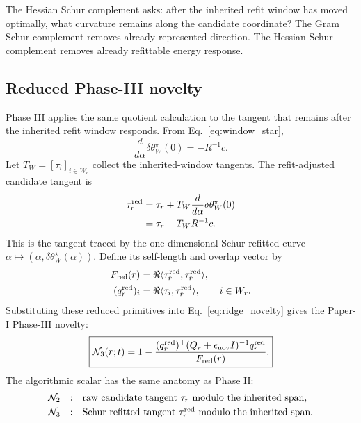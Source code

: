 \documentclass[10pt,twocolumn]{article}
\begin{document}
\begin{jargonbox}
The Hessian Schur complement asks: after the inherited refit window has moved optimally, what curvature remains along the candidate coordinate? The Gram Schur complement removes already represented direction. The Hessian Schur complement removes already refittable energy response.
\end{jargonbox}

\subsection{Reduced Phase-III novelty}

Phase III applies the same quotient calculation to the tangent that remains after the inherited refit window responds. From Eq.~\eqref{eq:window_star},
\begin{equation}
\frac{d}{d\alpha}\delta\theta_W^\star(0)=-R^{-1}c.
\label{eq:window_response_derivative}
\end{equation}
Let \(T_W=[\tau_i]_{i\in W_r}\) collect the inherited-window tangents. The refit-adjusted candidate tangent is
\begin{equation}
\begin{aligned}
\tau_r^{\rm red}
&=\tau_r+
T_W\frac{d}{d\alpha}\delta\theta_W^\star(0)\\
&=\tau_r-T_WR^{-1}c.
\end{aligned}
\label{eq:reduced_tangent}
\end{equation}
This is the tangent traced by the one-dimensional Schur-refitted curve
\(\alpha\mapsto(\alpha,\delta\theta_W^\star(\alpha))\). Define its self-length and overlap vector by
\begin{align}
F_{\rm red}(r)&=\Re\langle\tau_r^{\rm red},\tau_r^{\rm red}\rangle,
\notag\\
(q_r^{\rm red})_i&=\Re\langle\tau_i,\tau_r^{\rm red}\rangle,
\qquad i\in W_r.
\label{eq:reduced_F_q}
\end{align}
Substituting these reduced primitives into Eq.~\eqref{eq:ridge_novelty} gives the Paper-I Phase-III novelty:
\begin{equation}
\boxed{
\mathcal N_3(r;t)
=
1-
\frac{
(q_r^{\rm red})^\top
(Q_r+\epsilon_{\rm nov}I)^{-1}
q_r^{\rm red}
}{
F_{\rm red}(r)
}.
}
\label{eq:phase3_reduced_novelty}
\end{equation}
The algorithmic scalar has the same anatomy as Phase II:
\begin{equation}
\begin{array}{ccl}
\mathcal N_2&:&
\text{raw candidate tangent }\tau_r
\text{ modulo the inherited span},\\[1mm]
\mathcal N_3&:&
\text{Schur-refitted tangent }\tau_r^{\rm red}
\text{ modulo the inherited span}.
\end{array}
\label{eq:n2_n3_reading}
\end{equation}
\end{document}
